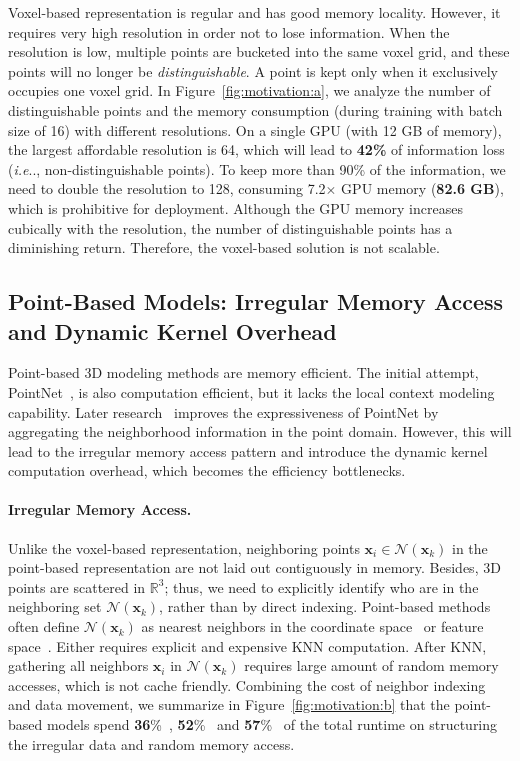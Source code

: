 \documentclass{article}
\makeatletter
\newcommand{\fig}[1]{Figure~\ref{#1}}
\DeclareRobustCommand\onedot{\futurelet\@let@token\@onedot}
\def\@onedot{\ifx\@let@token.\else.\null\fi\xspace}
\def\ie{\emph{i.e}\onedot} \def\Ie{\emph{I.e}\onedot}
\newcommand{\myparagraph}[1]{\vspace{-6pt}\paragraph{#1}}
\makeatother
\begin{document}
Voxel-based representation is regular and has good memory locality. However, it requires very high resolution in order not to lose information. When the resolution is low, multiple points are bucketed into the same voxel grid, and these points will no longer be \emph{distinguishable}. A point is kept only when it exclusively occupies one voxel grid. In \fig{fig:motivation:a}, we analyze the number of distinguishable points and the memory consumption (during training with batch size of 16) with different resolutions. On a single GPU (with 12 GB of memory), the largest affordable resolution is 64, which will lead to \textbf{42\%} of information loss (\ie, non-distinguishable points). To keep more than 90\% of the information, we need to double the resolution to 128, consuming 7.2$\times$ GPU memory (\textbf{82.6 GB}), which is prohibitive for deployment. Although the GPU memory increases cubically with the resolution, the number of distinguishable points has a diminishing return. Therefore, the voxel-based solution is not scalable.

\subsection{Point-Based Models: Irregular Memory Access and Dynamic Kernel Overhead}

Point-based 3D modeling methods are memory efficient. The initial attempt, PointNet~\cite{Qi:2017vq}, is also computation efficient, but it lacks the local context modeling capability. Later research~\cite{Qi:2017tf,Li:2018tp,Wang:2018dg,Xu:2018sp} improves the expressiveness of PointNet by aggregating the neighborhood information in the point domain. However, this will lead to the irregular memory access pattern and introduce the dynamic kernel computation overhead, which becomes the efficiency bottlenecks.

\myparagraph{Irregular Memory Access.}

Unlike the voxel-based representation, neighboring points $\bm{x}_i \in \mathcal{N}(\bm{x}_k)$ in the point-based representation are not laid out contiguously in memory. Besides, 3D points are scattered in $\mathbb{R}^3$; thus, we need to explicitly identify who are in the neighboring set $\mathcal{N}(\bm{x}_k)$, rather than by direct indexing. Point-based methods often define $\mathcal{N}(\bm{x}_k)$ as nearest neighbors in the coordinate space~\cite{Li:2018tp,Xu:2018sp} or feature space~\cite{Wang:2018dg}. Either requires explicit and expensive KNN computation. After KNN, gathering all neighbors $\bm{x}_i$ in $\mathcal{N}(\bm{x}_k)$ requires large amount of random memory accesses, which is not cache friendly. Combining the cost of neighbor indexing and data movement, we summarize in \fig{fig:motivation:b} that the point-based models spend \textbf{36}\%~\cite{Li:2018tp}, \textbf{52}\%~\cite{Wang:2018dg} and \textbf{57}\%~\cite{Xu:2018sp} of the total runtime on structuring the irregular data and random memory access.
\end{document}
